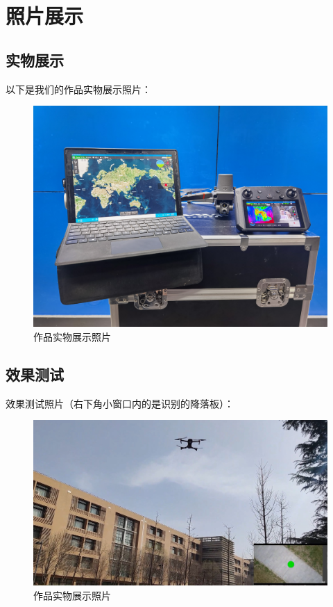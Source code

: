 \chapter{照片展示}
\section{实物展示}
以下是我们的作品实物展示照片：

\begin{figure}[H]
  \centering
  \includegraphics[width=0.8\linewidth]{./Figure/Real_Picture.jpg}
  \caption{作品实物展示照片}\label{Fig:append_img1}
\end{figure}

\section{效果测试}
效果测试照片（右下角小窗口内的是识别的降落板）：

\begin{figure}[H]
  \centering
  \includegraphics[width=0.8\linewidth]{./Figure/Landing_Real_Picture.jpg}
  \caption{作品实物展示照片}\label{Fig:append_img2}
\end{figure}

